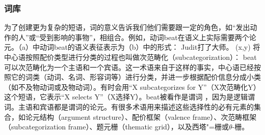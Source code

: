 \subsubsection{词库}
\label{Abschnitt-GB-Lexikon}
为了创建更为复杂的短语，词的意义告诉我们他们需要跟一定的角色，如“发出动作的人”或“受到影响的事物”，相组合。例如，动词beat在语义上实际需要两个论元。（a）中动词beat的语义表征表示为（b）中的形式：
\eal
\ex Judit打了大师。
\ex {}(x,y)
\zl
\noindent
将中心语按照配价类型进行分类的过程也叫做次范畴化（subcategorization）：\label{Seite-Subkategoriesierung} beat可以次范畴化为一个主语和一个宾语。这一术语来自于这样的事实，中心语已经按照它的词类（动词、名词、形容词等）进行分类，并进一步根据配价信息分成小类（如不及物动词或及物动词）。有时会用“X subcategorizes for Y”（X次范畴化Y）这个短语，它表示“X selects Y”（X选择Y）。beat被看作是谓词 ，因为是逻辑谓词。主语和宾语都是谓词的论元。有很多术语用来描述这些选择性的必有元素的集合，如论元结构（argument structure）、配价框架（valence frame）、次范畴框架（subcategorization frame）、题元栅（thematic grid），以及西塔"=栅或$\theta$-栅。
